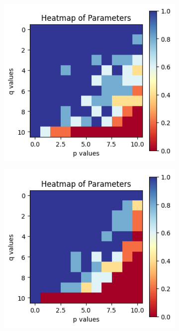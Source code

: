 \begin{figure}[h]
     \centering
     \begin{subfigure}{0.45\textwidth}
         \centering
         \includegraphics[width=\linewidth]{./Figures/size 30 heatmap.png}
         \label{fig:1a}
     \end{subfigure}
     \begin{subfigure}{0.45\textwidth}
         \centering
         \includegraphics[width=\linewidth]{./Figures/size 100 heatmap.png}

\end{subfigure}
\end{figure}
